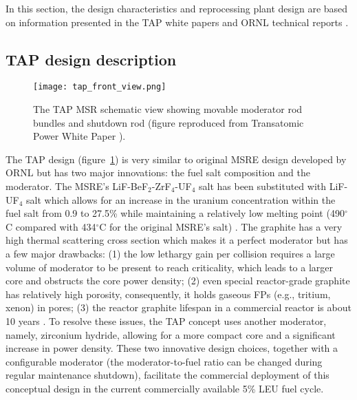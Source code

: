 In this section, the design characteristics and reprocessing plant design are 
based on
information presented in the TAP white papers  
\cite{transatomic_power_corporation_technical_2016, 
transatomic_power_corporation_neutronics_2016} and \gls{ORNL} technical 
reports \cite{betzler_two-dimensional_2017, betzler_assessment_2017}.

\subsection{TAP design description}
\begin{figure}[h] %
	  		\hspace{+2.2in}
	\texttt{[image: tap\_front\_view.png]}
	\caption{The \gls{TAP} \gls{MSR} schematic view showing movable moderator 
		rod 
		bundles and shutdown rod (figure reproduced from Transatomic Power 
		White Paper 
		\cite{transatomic_power_corporation_technical_2016}).}
	\label{fig:tap-main-view}
\end{figure}
The \gls{TAP} design (figure~\ref{fig:tap-main-view}) is very similar to 
original \gls{MSRE} design developed by \gls{ORNL} 
\cite{haubenreich_experience_1970} but has two major innovations: 
the fuel salt composition and the moderator. The \gls{MSRE}'s 
LiF-BeF$_2$-ZrF$_4$-UF$_4$ salt has been substituted with LiF-UF$_4$ salt 
which allows for an increase in the uranium concentration within the fuel salt 
from 0.9 to 27.5\% while maintaining a relatively low melting point 
(490$^{\circ}$C compared with 434$^{\circ}$C for the original \gls{MSRE}'s 
salt) \cite{betzler_two-dimensional_2017}. The graphite has a very high 
thermal scattering cross section which makes it a perfect moderator but has 
a few major drawbacks: 
(1) the low lethargy gain per collision requires a large volume of moderator 
to be present to reach criticality, which leads to a larger core and obstructs 
the core power density; (2) even special 
reactor-grade graphite has relatively high porosity, consequently, it holds
gaseous \glspl{FP} 
(e.g., tritium, xenon) in pores; (3) the reactor graphite lifespan in a 
commercial 
reactor is about 10 years \cite{robertson_conceptual_1971}. To resolve these 
issues, the \gls{TAP} concept uses another 
moderator, namely, zirconium hydride, allowing for a more compact core and a 
significant increase in power density. These two innovative design choices,  
together with a configurable moderator 
(the moderator-to-fuel ratio can be changed during regular maintenance 
shutdown), 
facilitate the commercial deployment of this conceptual design in the current 
commercially available 5\% \gls{LEU} fuel cycle. 

